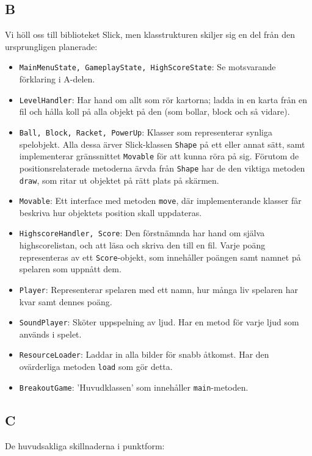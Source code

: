 \documentclass[11pt,a4paper]{article}
\begin{document}
\subsection{B}
Vi höll oss till biblioteket Slick, men klasstrukturen skiljer sig en del från den ursprungligen planerade:

\begin{itemize}
	\item \texttt{MainMenuState, GameplayState, HighScoreState}: Se motsvarande förklaring i A-delen.
	\item \texttt{LevelHandler}: Har hand om allt som rör kartorna; ladda in en karta från en fil och hålla koll på alla objekt på den (som bollar, block och så vidare).
	\item \texttt{Ball, Block, Racket, PowerUp}: Klasser som representerar synliga spelobjekt. Alla dessa ärver Slick-klassen \texttt{Shape} på ett eller annat sätt, samt implementerar gränssnittet \texttt{Movable} för att kunna röra på sig. Förutom de positionsrelaterade metoderna ärvda från \texttt{Shape} har de den viktiga metoden \texttt{draw}, som ritar ut objektet på rätt plats på skärmen.
	\item \texttt{Movable}: Ett interface med metoden \texttt{move}, där implementerande klasser får beskriva hur objektets position skall uppdateras.
	\item \texttt{HighscoreHandler, Score}: Den förstnämnda har hand om själva highscorelistan, och att läsa och skriva den till en fil. Varje poäng representeras av ett \texttt{Score}-objekt, som innehåller poängen samt namnet på spelaren som uppnått dem.
	\item \texttt{Player}: Representerar spelaren med ett namn, hur många liv spelaren har kvar samt dennes poäng.
	\item \texttt{SoundPlayer}: Sköter uppspelning av ljud. Har en metod för varje ljud som används i spelet.
	\item \texttt{ResourceLoader}: Laddar in alla bilder för snabb åtkomst. Har den ovärderliga metoden \texttt{load} som gör detta.
	\item \texttt{BreakoutGame}: 'Huvudklassen' som innehåller \texttt{main}-metoden.
\end{itemize}

\subsection{C}
De huvudsakliga skillnaderna i punktform:
\end{document}
